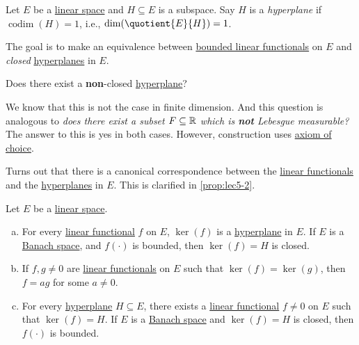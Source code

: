 \begin{definition}[Hyperplane]\label{def:hyperplane}
	Let \(E\) be a \hyperref[def:linear-vector-space]{linear space} and \(H\subseteq E\) is a subspace. Say \(H\) is a \emph{hyperplane} if \(\mathop{\mathrm{codim}}(H)=1\), i.e., \(\dim (\quotient{E}{H})=1\).
\end{definition}

The goal is to make an equivalence between \hyperref[def:bounded-linear-functional]{bounded linear functionals} on \(E\) and \emph{closed} \hyperref[def:hyperplane]{hyperplanes} in \(E\).

\begin{problem}
Does there exist a \textbf{non}-closed \hyperref[def:hyperplane]{hyperplane}?
\end{problem}
\begin{answer}
	We know that this is not the case in finite dimension. And this question is analogous to \emph{does there exist a subset \(F\subseteq \mathbb{\MakeUppercase{r}} \) which is \textbf{not} Lebesgue measurable?} The answer to this is yes in both cases. However, construction uses \href{https://en.wikipedia.org/wiki/Axiom_of_choice}{axiom of choice}.
\end{answer}

Turns out that there is a canonical correspondence between the \hyperref[def:linear-functional]{linear functionals} and the \hyperref[def:hyperplane]{hyperplanes} in \(E\). This is clarified in \autoref{prop:lec5-2}.

\begin{proposition}\label{prop:lec5-2}
	Let \(E\) be a \hyperref[def:linear-vector-space]{linear space}.
	\begin{enumerate}[(a)]
		\item For every \hyperref[def:linear-functional]{linear functional} \(f\) on \(E\), \(\ker(f)\) is a \hyperref[def:hyperplane]{hyperplane} in \(E\). If \(E\) is a \hyperref[def:Banach-space]{Banach space}, and \(f(\cdot)\) is bounded, then \(\ker(f) = H\) is closed.
		\item If \(f, g \neq 0\) are \hyperref[def:linear-functional]{linear functionals} on \(E\) such that \(\ker(f) = \ker(g)\), then \(f = ag\) for some \(a \neq 0\).
		\item For every \hyperref[def:hyperplane]{hyperplane} \(H\subseteq E\), there exists a \hyperref[def:linear-functional]{linear functional} \(f \neq 0\) on \(E\) such that \(\ker(f) = H\). If \(E\) is a \hyperref[def:Banach-space]{Banach space} and \(\ker(f) = H\) is closed, then \(f(\cdot)\) is bounded.
	\end{enumerate}
\end{proposition}